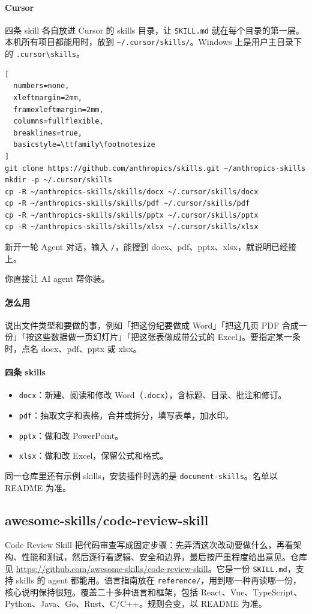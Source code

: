 \paragraph{Cursor}
四条 skill 各自放进 Cursor 的 skills 目录，让 \verb|SKILL.md| 就在每个目录的第一层。本机所有项目都能用时，放到 \verb|~/.cursor/skills/|。Windows 上是用户主目录下的 \verb|.cursor\skills|。
\begin{lstlisting}[
  numbers=none,
  xleftmargin=2mm,
  framexleftmargin=2mm,
  columns=fullflexible,
  breaklines=true,
  basicstyle=\ttfamily\footnotesize
]
git clone https://github.com/anthropics/skills.git ~/anthropics-skills
mkdir -p ~/.cursor/skills
cp -R ~/anthropics-skills/skills/docx ~/.cursor/skills/docx
cp -R ~/anthropics-skills/skills/pdf ~/.cursor/skills/pdf
cp -R ~/anthropics-skills/skills/pptx ~/.cursor/skills/pptx
cp -R ~/anthropics-skills/skills/xlsx ~/.cursor/skills/xlsx
\end{lstlisting}
新开一轮 Agent 对话，输入 \verb|/|，能搜到 docx、pdf、pptx、xlsx，就说明已经接上。

\begin{xiaonao}
你直接让 AI agent 帮你装。
\end{xiaonao}

\paragraph{怎么用}
说出文件类型和要做的事，例如「把这份纪要做成 Word」「把这几页 PDF 合成一份」「按这些数据做一页幻灯片」「把这张表做成带公式的 Excel」。要指定某一条时，点名 docx、pdf、pptx 或 xlsx。

\paragraph{四条 skills}
\begin{itemize}
\item \verb|docx|：新建、阅读和修改 Word（\verb|.docx|），含标题、目录、批注和修订。
\item \verb|pdf|：抽取文字和表格，合并或拆分，填写表单，加水印。
\item \verb|pptx|：做和改 PowerPoint。
\item \verb|xlsx|：做和改 Excel，保留公式和格式。
\end{itemize}
同一仓库里还有示例 skills，安装插件时选的是 \verb|document-skills|。名单以 README 为准。



\subsection{awesome-skills/code-review-skill}
Code Review Skill 把代码审查写成固定步骤：先弄清这次改动要做什么，再看架构、性能和测试，然后逐行看逻辑、安全和边界，最后按严重程度给出意见。仓库见 \url{https://github.com/awesome-skills/code-review-skill}。它是一份 \verb|SKILL.md|，支持 skills 的 agent 都能用。语言指南放在 \verb|reference/|，用到哪一种再读哪一份，核心说明保持很短。覆盖二十多种语言和框架，包括 React、Vue、TypeScript、Python、Java、Go、Rust、C/C++。规则会变，以 README 为准。

